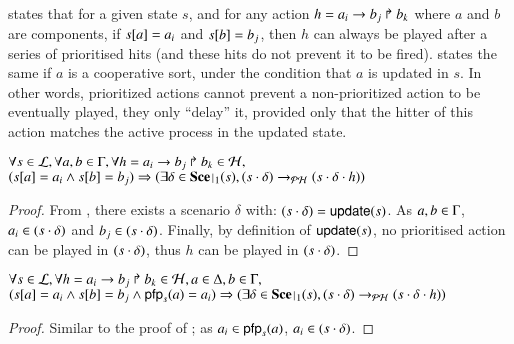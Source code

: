  states that for a given state $s$, and for any action $h = a_i\rightarrow b_j\Rsh b_k$ where $a$ and $b$ are components,
if ${s[a]} = a_i$ and ${s[b]} = b_j$, then
$h$ can always be played after a series of prioritised hits (and these hits do not prevent it to be fired).
 states the same if $a$ is a cooperative sort, under the condition that $a$ is updated in $s$.
In other words, prioritized actions cannot prevent a non-prioritized action
to be eventually played, they only ``delay'' it,
provided only that the hitter of this action
matches the active process in the updated state.

\begin{lemma}
\label{lem:hcompcomp}
  $\forall s \in \mathcal{L}, \forall a,b \in \Gamma, \forall h = a_i\rightarrow b_j\Rsh b_k \in \mathcal{H},$\\
  $(\PHget{s}{a} = a_i \wedge \PHget{s}{b} = b_j) \Rightarrow (\exists \delta \in \restriction{\Sce}{1}(s),
  (s \PHplay \delta) \PHPtrans (s \PHplay \delta \PHplay h))$
\end{lemma}
%
\begin{proof}
  From , there exists a scenario $\delta$ with: $(s \cdot \delta) = \mathsf{update}(s)$.
  As $a,b \in \Gamma$, $a_i \in (s \cdot \delta)$ and $b_j \in (s \cdot \delta)$.
  Finally, by definition of $\mathsf{update}(s)$, no prioritised action can be played in $(s \cdot \delta)$, thus $h$ can be played in $(s \cdot \delta)$.
\end{proof}
%
\begin{lemma}
\label{lem:hcscomp}
  $\forall s \in \mathcal{L}, \forall h = a_i\rightarrow b_j\Rsh b_k \in \mathcal{H}, a \in \Delta, b \in \Gamma,$\\
  $(\PHget{s}{a} = a_i \wedge \PHget{s}{b} = b_j \wedge \pfp_s(a) = a_i) \Rightarrow (\exists \delta \in \restriction{\Sce}{1}(s),
  (s \PHplay \delta) \PHPtrans (s \PHplay \delta \PHplay h))$
\end{lemma}
\begin{proof}
  Similar to the proof of ;
  as $a_i \in \mathsf{pfp}_s(a)$, $a_i \in (s \cdot \delta)$.
\end{proof}

%

